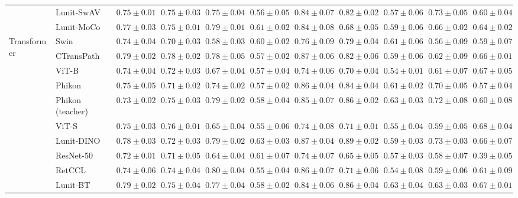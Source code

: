 \begin{tabular}{ll|cccc|c|cccc}
 & Lunit-SwAV & $0.75 \pm 0.01$ & $0.75 \pm 0.03$ & $0.75 \pm 0.04$ & $0.56 \pm 0.05$ & $0.84 \pm 0.07$ & $0.82 \pm 0.02$ & $0.57 \pm 0.06$ & $0.73 \pm 0.05$ & $0.60 \pm 0.04$ \\
 & Lunit-MoCo & $0.77 \pm 0.03$ & $0.75 \pm 0.01$ & $0.79 \pm 0.01$ & $0.61 \pm 0.02$ & $0.84 \pm 0.08$ & $0.68 \pm 0.05$ & $0.59 \pm 0.06$ & $0.66 \pm 0.02$ & $0.64 \pm 0.02$ \\
\cline{1-11}
\multirow[t]{12}{*}{Transformer} & Swin & $0.74 \pm 0.04$ & $0.70 \pm 0.03$ & $0.58 \pm 0.03$ & $0.60 \pm 0.02$ & $0.76 \pm 0.09$ & $0.79 \pm 0.04$ & $0.61 \pm 0.06$ & $0.56 \pm 0.09$ & $0.59 \pm 0.07$ \\
 & CTransPath & $\mathbf{0.79 \pm 0.02}$ & $\mathbf{0.78 \pm 0.02}$ & $0.78 \pm 0.05$ & $0.57 \pm 0.02$ & $0.87 \pm 0.06$ & $0.82 \pm 0.06$ & $0.59 \pm 0.06$ & $0.62 \pm 0.09$ & $0.66 \pm 0.01$ \\
 & ViT-B & $0.74 \pm 0.04$ & $0.72 \pm 0.03$ & $0.67 \pm 0.04$ & $0.57 \pm 0.04$ & $0.74 \pm 0.06$ & $0.70 \pm 0.04$ & $0.54 \pm 0.01$ & $0.61 \pm 0.07$ & $0.67 \pm 0.05$ \\
 & Phikon & $0.75 \pm 0.05$ & $0.71 \pm 0.02$ & $0.74 \pm 0.02$ & $0.57 \pm 0.02$ & $0.86 \pm 0.04$ & $0.84 \pm 0.04$ & $0.61 \pm 0.02$ & $0.70 \pm 0.05$ & $0.57 \pm 0.04$ \\
 & Phikon (teacher) & $0.73 \pm 0.02$ & $0.75 \pm 0.03$ & $0.79 \pm 0.02$ & $0.58 \pm 0.04$ & $0.85 \pm 0.07$ & $0.86 \pm 0.02$ & $0.63 \pm 0.03$ & $0.72 \pm 0.08$ & $0.60 \pm 0.08$ \\
 & ViT-S & $0.75 \pm 0.03$ & $0.76 \pm 0.01$ & $0.65 \pm 0.04$ & $0.55 \pm 0.06$ & $0.74 \pm 0.08$ & $0.71 \pm 0.01$ & $0.55 \pm 0.04$ & $0.59 \pm 0.05$ & $\mathbf{0.68 \pm 0.04}$ \\
 & Lunit-DINO & $0.78 \pm 0.03$ & $0.72 \pm 0.03$ & $0.79 \pm 0.02$ & $\mathbf{0.63 \pm 0.03}$ & $\mathbf{0.87 \pm 0.04}$ & $\mathbf{0.89 \pm 0.02}$ & $0.59 \pm 0.03$ & $\mathbf{0.73 \pm 0.03}$ & $0.66 \pm 0.07$ \\
 & ResNet-50 & $0.72 \pm 0.01$ & $0.71 \pm 0.05$ & $0.64 \pm 0.04$ & $0.61 \pm 0.07$ & $0.74 \pm 0.07$ & $0.65 \pm 0.05$ & $0.57 \pm 0.03$ & $0.58 \pm 0.07$ & $0.39 \pm 0.05$ \\
 & RetCCL & $0.74 \pm 0.06$ & $0.74 \pm 0.04$ & $\mathbf{0.80 \pm 0.04}$ & $0.55 \pm 0.04$ & $0.86 \pm 0.07$ & $0.71 \pm 0.06$ & $0.54 \pm 0.08$ & $0.59 \pm 0.06$ & $0.61 \pm 0.09$ \\
 & Lunit-BT & $0.79 \pm 0.02$ & $0.75 \pm 0.04$ & $0.77 \pm 0.04$ & $0.58 \pm 0.02$ & $0.84 \pm 0.06$ & $0.86 \pm 0.04$ & $\mathbf{0.63 \pm 0.04}$ & $0.63 \pm 0.03$ & $0.67 \pm 0.01$ \\

\end{tabular}
